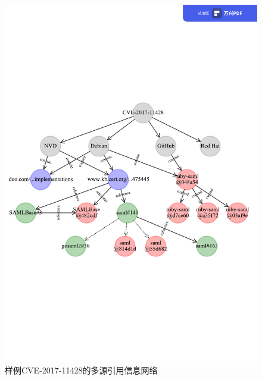 \begin{figure}[h]
    \centering
    \includegraphics[scale=0.68]{fig/network-example.pdf}
    \caption{样例CVE-2017-11428的多源引用信息网络}\label{fig:example}
\end{figure}

